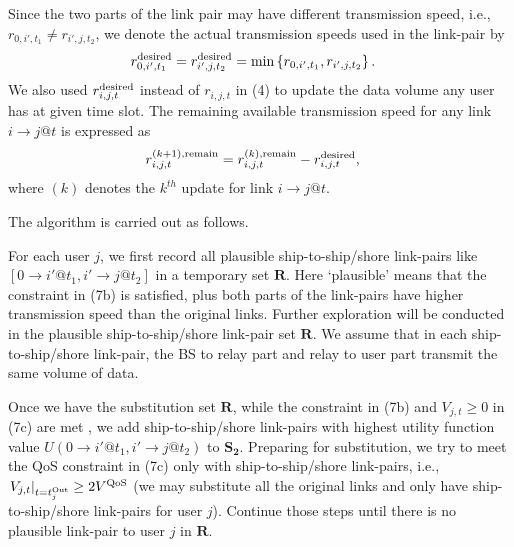 \documentclass[journal]{IEEEtran}
\begin{document}
   Since the two parts of the link pair may have different transmission speed, i.e., $r_{0,i',{t_1}} \ne r_{i',j,{t_2}}$, we denote the actual transmission speeds used in the link-pair by 
   \begin{align}
   &r_{0,i',{t_1}}^{\rm{desired}}=r_{i',j,{t_2}}^{\rm{desired}}=\min \left\{ r_{0,i',{t_1}},r_{i',j,{t_2}} \right\}. 
   \end{align}
   We also used $r_{i,j,{t}}^{\rm{desired}}$ instead of $r_{i,j,{t}}$ in (4) to update the data volume any user has at given time slot. 
   The remaining available transmission speed for any link $i \to j @ t$ is expressed as
   \begin{align}
    &r_{i,j,{t}}^{\left( k+1 \right),\rm{remain}} = r_{i,j,{t}}^{\left( k \right),\rm{remain}} - r_{i,j,{t}}^{\rm{desired}}, 
   \end{align}
   where $\left( k \right)$ denotes the $k^{th}$ update for link $i \to j @ t$. 
   
   The algorithm is carried out as follows.
   
   For each user $j$, we first record all plausible ship-to-ship/shore link-pairs like $\left[ {0 \to i'@{t_1},i' \to j@{t_2}} \right]$ in a temporary set $\mathbf{R}$. Here `plausible' means that the constraint in (7b) 
   is satisfied, plus both parts of the link-pairs have higher transmission speed than the original links. Further exploration will be conducted in the plausible ship-to-ship/shore link-pair set $\mathbf{R}$. We assume that in each ship-to-ship/shore link-pair, the BS to relay part and relay to user part transmit the same volume of data.
  
   Once we have the substitution set $\mathbf{R}$, while the constraint in (7b) and ${V_{j,t}} \ge 0$ in (7c) are met%
   , we add ship-to-ship/shore link-pairs with highest utility function value $U\left(0 \to i'@{t_1}, i'\to j@{t_2} \right)$ to ${{\mathbf{S}}_{\mathbf{2}}}$. Preparing for substitution, we try to meet the QoS constraint in (7c) only with ship-to-ship/shore link-pairs, i.e., ${\left. {{V_{j,t}}} \right|_{t = t_j^{{\rm{Out}}}}} \ge 2{V^{\rm{QoS}}}$ (we may substitute all the original links and only have ship-to-ship/shore link-pairs for user $j$). 
   Continue those steps until there is no plausible link-pair to user $j$ in $\mathbf{R}$. %
  
\end{document}
